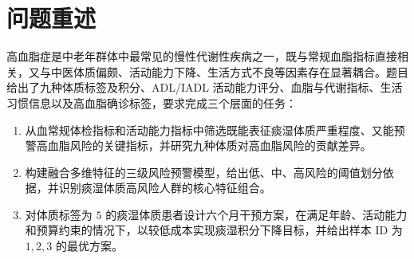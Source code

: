 \documentclass{MathorCupmodeling}
\begin{document}
	\begin{abstract}
		针对中老年人群高血脂症的早期筛查、分层预警与个体化干预需求，本文基于附件 1000 例样本数据，构建了“指标筛选—风险预警—干预优化”的一体化分析框架。

		针对问题一，在处理完标签异常后，本文采用多种统计手段评估指标与痰湿程度、确诊风险的关联。通过 Spearman 相关系数、互信息及随机森林特征重要度等多维方法的等权综合评价，发现 TG、TC、LDL-C 和 HDL-C 是最具解释力的高血脂诊断指标。此外，在剔除这些直接诊断性指标后，血尿酸、空腹血糖、BMI、活动能力及痰湿积分仍体现出较强的先兆预警价值。

		针对问题二，本文将风险识别细分为“诊断”与“早预警”两个层面。通过对数据进行分位截尾、特征派生等稳健预处理，诊断型模型（保留核心脂质变量）在测试集上达到了 1.0000 的 AUC；而剔除直接血脂指标的早预警模型也取得了 0.8283 的 AUC。结合模型概率、临床指标和功能现状，本文划定了低、中、高三级风险阈值，并挖掘出诸如“血脂异常+尿酸偏高”等核心高发组合特征，为临床评估提供了可参考的规则依据。

		针对问题三，本文构建了以月度干预强度及每周训练频次为决策变量的离散动态规划干预模型，力求在 2000 元总预算内使得痰湿患者的体质积分降低至少 10\%。模型综合考量了年龄与活动能力的限制，对 1、2、3 号患者生成了“前期集中发力降分，后期低成本维持”的个体化最优方案。整体研究不仅保证了模型的精准性与稳健性，亦突出了基层慢病管理的可操作性与现实指导意义。
	\end{abstract}
	\tableofcontents
	\newpage
	\setcounter{page}{1}

	\section{问题重述}
	高血脂症是中老年群体中最常见的慢性代谢性疾病之一，既与常规血脂指标直接相关，又与中医体质偏颇、活动能力下降、生活方式不良等因素存在显著耦合。题目给出了九种体质标签及积分、ADL/IADL 活动能力评分、血脂与代谢指标、生活习惯信息以及高血脂确诊标签，要求完成三个层面的任务：
	\begin{enumerate}
		\item 从血常规体检指标和活动能力指标中筛选既能表征痰湿体质严重程度、又能预警高血脂风险的关键指标，并研究九种体质对高血脂风险的贡献差异。
		\item 构建融合多维特征的三级风险预警模型，给出低、中、高风险的阈值划分依据，并识别痰湿体质高风险人群的核心特征组合。
		\item 对体质标签为 $5$ 的痰湿体质患者设计六个月干预方案，在满足年龄、活动能力和预算约束的情况下，以较低成本实现痰湿积分下降目标，并给出样本 ID 为 $1,2,3$ 的最优方案。
	\end{enumerate}
\end{document}
